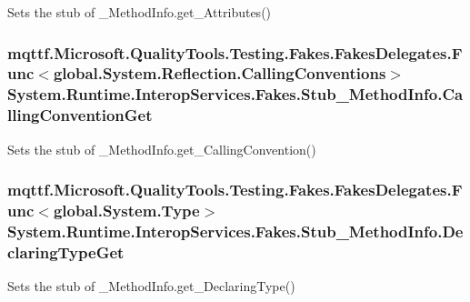 Sets the stub of \-\_\-\-Method\-Info.\-get\-\_\-\-Attributes()

\hypertarget{class_system_1_1_runtime_1_1_interop_services_1_1_fakes_1_1_stub___method_info_a285e22b393af38c032bd43e90f5b8515}{
\subsubsection[{Calling\-Convention\-Get}]{\setlength{\rightskip}{0pt plus 5cm}mqttf.\-Microsoft.\-Quality\-Tools.\-Testing.\-Fakes.\-Fakes\-Delegates.\-Func$<$global.\-System.\-Reflection.\-Calling\-Conventions$>$ System.\-Runtime.\-Interop\-Services.\-Fakes.\-Stub\-\_\-\-Method\-Info.\-Calling\-Convention\-Get}}\label{class_system_1_1_runtime_1_1_interop_services_1_1_fakes_1_1_stub___method_info_a285e22b393af38c032bd43e90f5b8515}


Sets the stub of \-\_\-\-Method\-Info.\-get\-\_\-\-Calling\-Convention()

\hypertarget{class_system_1_1_runtime_1_1_interop_services_1_1_fakes_1_1_stub___method_info_a15dfd669737847277b9f55ebc8617d44}{
\subsubsection[{Declaring\-Type\-Get}]{\setlength{\rightskip}{0pt plus 5cm}mqttf.\-Microsoft.\-Quality\-Tools.\-Testing.\-Fakes.\-Fakes\-Delegates.\-Func$<$global.\-System.\-Type$>$ System.\-Runtime.\-Interop\-Services.\-Fakes.\-Stub\-\_\-\-Method\-Info.\-Declaring\-Type\-Get}}\label{class_system_1_1_runtime_1_1_interop_services_1_1_fakes_1_1_stub___method_info_a15dfd669737847277b9f55ebc8617d44}


Sets the stub of \-\_\-\-Method\-Info.\-get\-\_\-\-Declaring\-Type()


